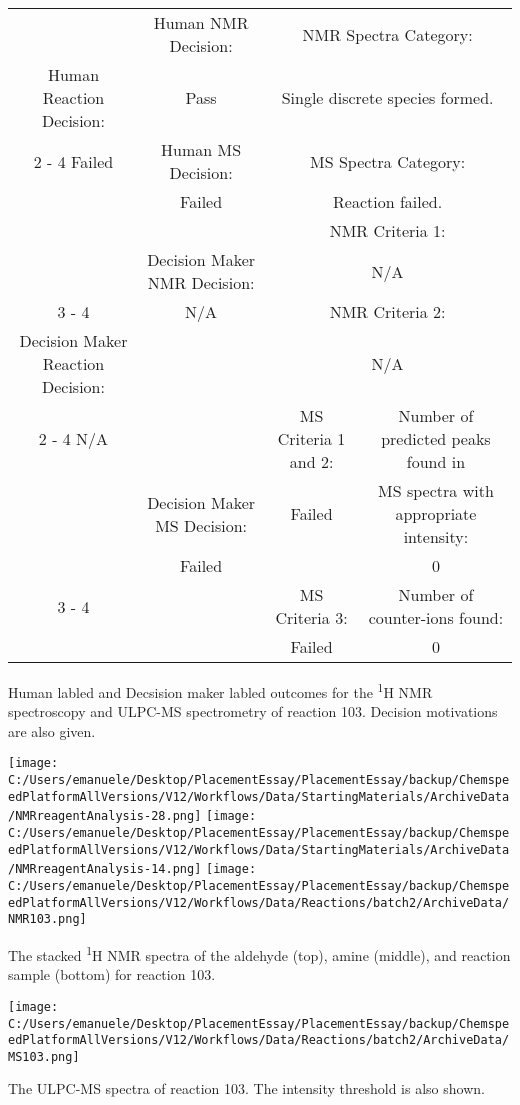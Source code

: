 \documentclass{article}%
\begin{document}
\begin{Decision Table}[H]%
\begin{tabular}{|c|c|c|c|}%
\hline%
&Human NMR Decision:&\multicolumn{2}{|c|}{NMR Spectra Category:}\\%
Human Reaction Decision:&Pass&\multicolumn{2}{|c|}{Single discrete species formed.}\\%
\cline{2%
-%
4}%
Failed&Human MS Decision:&\multicolumn{2}{|c|}{MS Spectra Category:}\\%
&Failed&\multicolumn{2}{|c|}{Reaction failed.}\\%
\hline%
&&\multicolumn{2}{|c|}{NMR Criteria 1:}\\%
&Decision Maker NMR Decision:&\multicolumn{2}{|c|}{N/A}\\%
\cline{3%
-%
4}%
&N/A&\multicolumn{2}{|c|}{NMR Criteria 2:}\\%
Decision Maker Reaction Decision:&&\multicolumn{2}{|c|}{N/A}\\%
\cline{2%
-%
4}%
N/A&&MS Criteria 1 and 2:&Number of predicted peaks found in\\%
&Decision Maker MS Decision:&Failed&MS spectra with appropriate intensity:\\%
&Failed&&0\\%
\cline{3%
-%
4}%
&&MS Criteria 3:&Number of counter{-}ions found:\\%
&&Failed&0\\%
\hline%
\end{tabular}%
\caption{Human labled and Decsision maker labled outcomes for the \textsuperscript{1}H NMR spectroscopy and ULPC-MS spectrometry of reaction 103. Decision motivations are also given.}%
\end{Decision Table}%
\begin{NMR Spectra}[H]%
\begin{center}%
\texttt{[image: C:/Users/emanuele/Desktop/PlacementEssay/PlacementEssay/backup/ChemspeedPlatformAllVersions/V12/Workflows/Data/StartingMaterials/ArchiveData/NMRreagentAnalysis-28.png]}\hfill%
\texttt{[image: C:/Users/emanuele/Desktop/PlacementEssay/PlacementEssay/backup/ChemspeedPlatformAllVersions/V12/Workflows/Data/StartingMaterials/ArchiveData/NMRreagentAnalysis-14.png]}\hfill%
\texttt{[image: C:/Users/emanuele/Desktop/PlacementEssay/PlacementEssay/backup/ChemspeedPlatformAllVersions/V12/Workflows/Data/Reactions/batch2/ArchiveData/NMR103.png]}\hfill%
\end{center}%
\caption{The stacked \textsuperscript{1}H NMR spectra of the aldehyde (top), amine (middle), and reaction sample (bottom) for reaction 103.}%
\end{NMR Spectra}%
\begin{MS Spectra}[H]%
\begin{center}%
\texttt{[image: C:/Users/emanuele/Desktop/PlacementEssay/PlacementEssay/backup/ChemspeedPlatformAllVersions/V12/Workflows/Data/Reactions/batch2/ArchiveData/MS103.png]}\hfill%
\end{center}%
\caption{The ULPC-MS spectra of reaction 103. The intensity threshold is also shown.}%
\end{MS Spectra}%
\end{document}
